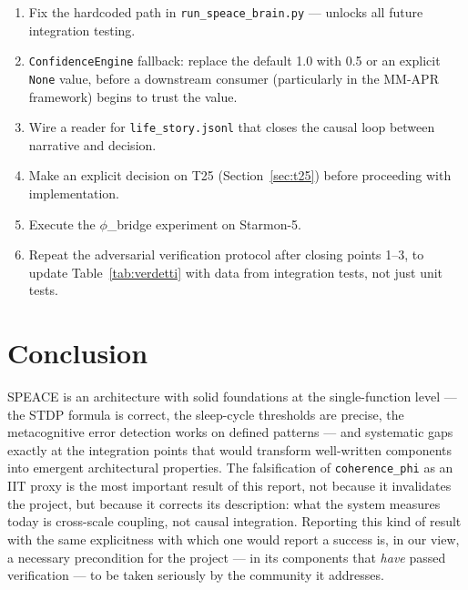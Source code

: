 \documentclass[11pt,a4paper]{article}
\newcommand{\code}[1]{\texttt{#1}}
\newcommand{\coherencephi}{\code{coherence\_phi}}
\newcommand{\starmon}{Starmon-5\xspace}
\begin{document}
\begin{enumerate}
  \item Fix the hardcoded path in \code{run\_speace\_brain.py} --- unlocks all future integration testing.
  \item \code{ConfidenceEngine} fallback: replace the default 1.0 with 0.5 or an explicit \code{None} value, before a downstream consumer (particularly in the MM-APR framework) begins to trust the value.
  \item Wire a reader for \code{life\_story.jsonl} that closes the causal loop between narrative and decision.
  \item Make an explicit decision on T25 (Section~\ref{sec:t25}) before proceeding with implementation.
  \item Execute the $\phi$\_bridge experiment on \starmon.
  \item Repeat the adversarial verification protocol after closing points 1--3, to update Table~\ref{tab:verdetti} with data from integration tests, not just unit tests.
\end{enumerate}

\section{Conclusion}
\label{sec:conclusion}

SPEACE is an architecture with solid foundations at the single-function level --- the STDP formula is correct, the sleep-cycle thresholds are precise, the metacognitive error detection works on defined patterns --- and systematic gaps exactly at the integration points that would transform well-written components into emergent architectural properties. The falsification of \coherencephi{} as an IIT proxy is the most important result of this report, not because it invalidates the project, but because it corrects its description: what the system measures today is cross-scale coupling, not causal integration. Reporting this kind of result with the same explicitness with which one would report a success is, in our view, a necessary precondition for the project --- in its components that \emph{have} passed verification --- to be taken seriously by the community it addresses.
\end{document}
